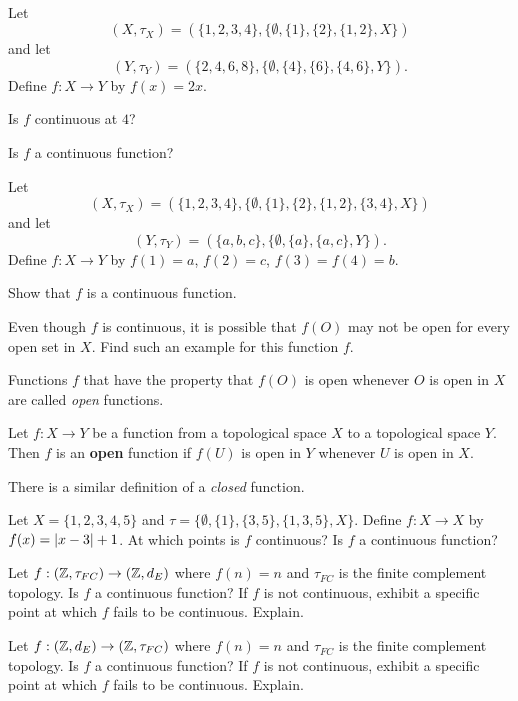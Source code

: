 \begin{pa}  ~
\be
\item Let 
\[(X, \tau_X) = (\{1,2,3,4\}, \{\emptyset, \{1\}, \{2\}, \{1,2\}, X \})\]
and let 
\[(Y, \tau_Y) = (\{2,4,6,8\}, \{\emptyset, \{4\}, \{6\}, \{4,6\}, Y\}).\]
Define $f: X \to Y$ by $f(x) = 2x$. 
	\ba
	\item Is $f$ continuous at $4$?

	\item Is $f$ a continuous function? 

	\ea

\item Let 
\[(X, \tau_X) = (\{1,2,3,4\}, \{\emptyset, \{1\}, \{2\}, \{1,2\}, \{3,4\}, X \})\]
and let 
\[(Y, \tau_Y) = (\{a,b,c\}, \{\emptyset, \{a\}, \{a,c\}, Y\}).\] 
Define $f: X \to Y$ by $f(1) = a$, $f(2) = c$, $f(3) = f(4) = b$. 
	\ba
	\item Show that $f$ is a continuous function.

	\item Even though $f$ is continuous, it is possible that $f(O)$ may not be open for every open set in $X$. Find such an example for this function $f$. 
	
	\ea
	
Functions $f$ that have the property that $f(O)$ is open whenever $O$ is open in $X$ are called \emph{open} functions.

\begin{definition} Let $f: X \to Y$ be a function from a topological space $X$ to a topological space $Y$. Then $f$ is an \textbf{open} function if $f(U)$ is open in $Y$ whenever $U$ is open in $X$. 
\end{definition}

There is a similar definition of a \emph{closed} function. 
	
	\item Let $X= \{1,2,3,4,5\}$ and $\tau = \{\emptyset,\{1\}, \{3,5\}, \{1,3,5\}, X\}$. Define $f: X \to X$ by $f(x) = \left| x-3 \right|+1$. At which points is $f$ continuous? Is $f$ a continuous function?
	
\item Let $f:(\mathbb{Z},\tau_{FC}) \to (\mathbb{Z}, d_E)$ where $f(n) = n$ and $\tau_{FC}$ is the finite complement topology. Is $f$ a continuous function? If $f$ is not continuous, exhibit a specific point at which $f$ fails to be continuous. Explain.

\item Let $f:(\mathbb{Z}, d_E) \to (\mathbb{Z},\tau_{FC})$ where $f(n) = n$ and $\tau_{FC}$ is the finite complement topology. Is $f$ a continuous function? If $f$ is not continuous, exhibit a specific point at which $f$ fails to be continuous. Explain. 


\end{pa}
